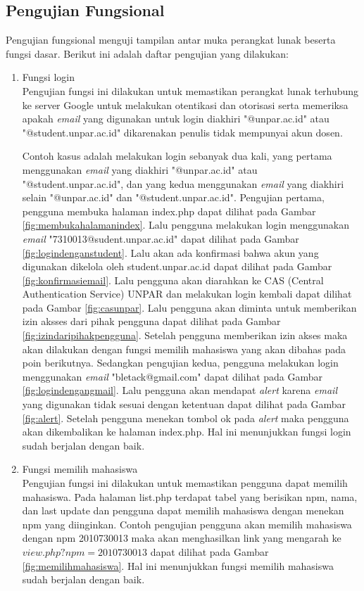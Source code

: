 \subsection{Pengujian Fungsional}
\label{sec:pengujianfungsional}
Pengujian fungsional menguji tampilan antar muka perangkat lunak beserta fungsi dasar. Berikut ini adalah daftar pengujian yang dilakukan:
\begin{enumerate}[(1)]
\item Fungsi login\\
    Pengujian fungsi ini dilakukan untuk memastikan perangkat lunak terhubung ke server Google untuk melakukan otentikasi dan otorisasi serta memeriksa apakah {\it email} yang digunakan untuk login diakhiri "@unpar.ac.id" atau "@student.unpar.ac.id" dikarenakan penulis tidak mempunyai akun dosen.
    
    Contoh kasus adalah melakukan login sebanyak dua kali, yang pertama menggunakan {\it email} yang diakhiri "@unpar.ac.id" atau "@student.unpar.ac.id", dan yang kedua menggunakan {\it email} yang diakhiri selain "@unpar.ac.id" dan "@student.unpar.ac.id". Pengujian pertama, pengguna membuka halaman index.php dapat dilihat pada Gambar \ref{fig:membukahalamanindex}. Lalu pengguna melakukan login menggunakan {\it email} "7310013@sudent.unpar.ac.id" dapat dilihat pada Gambar \ref{fig:logindenganstudent}. Lalu akan ada konfirmasi bahwa akun yang digunakan dikelola oleh student.unpar.ac.id dapat dilihat pada Gambar \ref{fig:konfirmasiemail}. Lalu pengguna akan diarahkan ke CAS (Central Authentication Service) UNPAR dan melakukan login kembali dapat dilihat pada Gambar \ref{fig:casunpar}. Lalu pengguna akan diminta untuk memberikan izin aksses dari pihak pengguna dapat dilihat pada Gambar \ref{fig:izindaripihakpengguna}. Setelah pengguna memberikan izin akses maka akan dilakukan dengan fungsi memilih mahasiswa yang akan dibahas pada poin berikutnya. Sedangkan pengujian kedua, pengguna melakukan login menggunakan {\it email} "bletack@gmail.com" dapat dilihat pada Gambar \ref{fig:logindengangmail}. Lalu pengguna akan mendapat {\it alert} karena {\it email} yang digunakan tidak sesuai dengan ketentuan dapat dilihat pada Gambar \ref{fig:alert}. Setelah pengguna menekan tombol ok pada {\it alert} maka pengguna akan dikembalikan ke halaman index.php. Hal ini menunjukkan fungsi login sudah berjalan dengan baik.

\item Fungsi memilih mahasiswa\\
	Pengujian fungsi ini dilakukan untuk memastikan pengguna dapat memilih mahasiswa. Pada halaman list.php terdapat tabel yang berisikan npm, nama, dan last update dan pengguna dapat memilih mahasiswa dengan menekan npm yang diinginkan. Contoh pengujian pengguna akan memilih mahasiswa dengan npm 2010730013 maka akan menghasilkan link yang mengarah ke $view.php?npm=2010730013$ dapat dilihat pada Gambar \ref{fig:memilihmahasiswa}. Hal ini menunjukkan fungsi memilih mahasiswa sudah berjalan dengan baik.
	

\end{enumerate}
